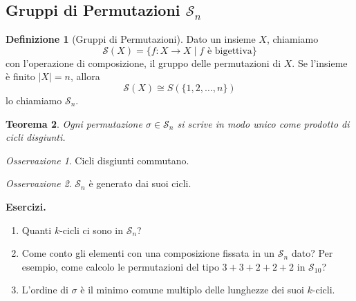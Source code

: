 \documentclass[a4paper]{article}
\newtheorem{theorem}{Teorema}[section]
\theoremstyle{remark}
\newtheorem*{remark}{Osservazione}
\theoremstyle{definition}
\newtheorem{definition}[theorem]{Definizione}
\begin{document}
\subsection{Gruppi di Permutazioni $ \mathcal{S}_n $}
\begin{multicols}{2}
\begin{definition}[Gruppi di Permutazioni]
	Dato un insieme $ X $, chiamiamo
	\[  \mathcal{S}(X) = \{ f: X \to X \mid f  \text{ è bigettiva}  \}  \]
	con l'operazione di composizione, il gruppo delle permutazioni di $ X $. Se l'insieme è finito $ |X| = n $, allora
	\[  \mathcal{S}(X) \cong S(\{ 1 ,2, \dots, n \})  \]
	lo chiamiamo $ \mathcal{S}_n $.
\end{definition}

\begin{theorem}
	Ogni permutazione $ \sigma \in \mathcal{S}_n $ si scrive in modo unico come prodotto di cicli disgiunti.
\end{theorem}
\begin{remark}
	Cicli disgiunti commutano.
\end{remark}


\begin{remark}
	$ \mathcal{S}_n $ è generato dai suoi cicli.
\end{remark}

\textbf{Esercizi.}
\begin{enumerate}
	\item Quanti $ k $-cicli ci sono in $ \mathcal{S}_n $?
	\item Come conto gli elementi con una composizione fissata in un $ \mathcal{S}_n $ dato? Per esempio, come calcolo le permutazioni del tipo $ 3+3+2+2+2 $ in $ \mathcal{S}_{10} $?
	\item L'ordine di $ \sigma $ è il minimo comune multiplo delle lunghezze dei suoi $ k $-cicli.
\end{enumerate}


\end{multicols}
\end{document}
